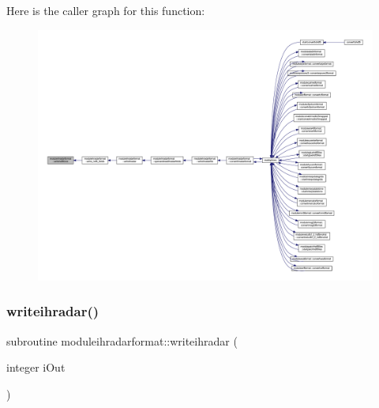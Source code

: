 Here is the caller graph for this function\+:\nopagebreak
\begin{figure}[H]
\begin{center}
\leavevmode
\includegraphics[width=350pt]{namespacemoduleihradarformat_abdd46dbddc8ccd64e7600d2abba43395_icgraph}
\end{center}
\end{figure}
\mbox{\label{namespacemoduleihradarformat_a6051373784b4b3c69f611fa904fbad43}} 
\subsubsection{\texorpdfstring{writeihradar()}{writeihradar()}}
{\footnotesize\ttfamily subroutine moduleihradarformat\+::writeihradar (\begin{DoxyParamCaption}\item[{integer}]{i\+Out }\end{DoxyParamCaption})\hspace{0.3cm}{\ttfamily [private]}}

